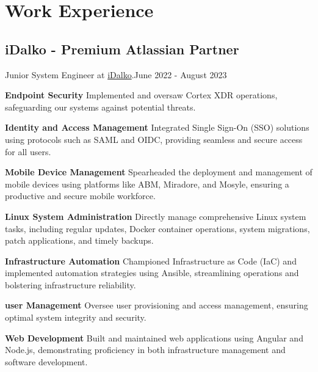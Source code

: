 \section{Work Experie\textcolor{mycolor}{nce}}
\subsection{iDalko - Premium Atlassian Partner}
\vspace{.55em}
Junior System Engineer at {\href{https://www.idalko.com}{iDalko}}.{\textcolor{mygrey}{\hspace*{\fill}June 2022 - August 2023}}
\vspace{.55em}
\begin{flushleft}
\par
\textbf{Endpoint Security}
Implemented and oversaw Cortex XDR operations, safeguarding our systems against potential threats.
\vspace{.55em}
\par
\textbf{Identity and Access Management}
Integrated Single Sign-On (SSO) solutions using protocols such as SAML and OIDC, providing seamless and secure access for all users.
\vspace{.55em}\par
\textbf{Mobile Device Management}
Spearheaded the deployment and management of mobile devices using platforms like ABM, Miradore, and Mosyle, ensuring a productive and secure mobile workforce.
\vspace{.55em}
\par
\textbf{Linux System Administration}
Directly manage comprehensive Linux system tasks, including regular updates, Docker container operations, system migrations, patch applications, and timely backups.
\vspace{.55em}
\par
\textbf{Infrastructure Automation}
Championed Infrastructure as Code (IaC) and implemented automation strategies using Ansible, streamlining operations and bolstering infrastructure reliability.
\vspace{.55em}
\par
\textbf{user Management}
Oversee user provisioning and access management, ensuring optimal system integrity and security.
\vspace{.55em}
\par
\textbf{Web Development}
Built and maintained web applications using Angular and Node.js, demonstrating proficiency in both infrastructure management and software development.
\vspace{.55em}
\end{flushleft}

